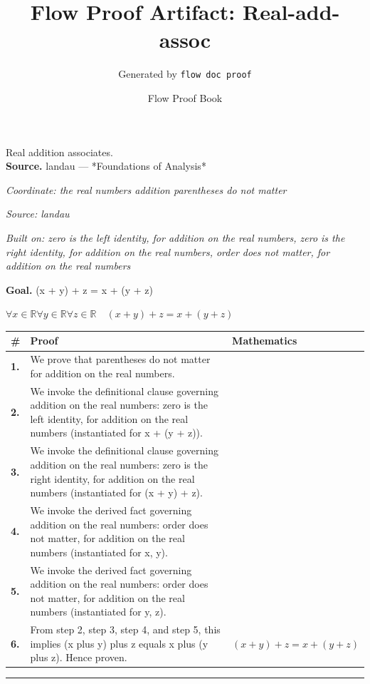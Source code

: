 \documentclass[11pt]{article}
\title{Flow Proof Artifact: Real-add-assoc}
\author{Generated by \texttt{flow doc proof}}
\date{Flow Proof Book}
\theoremstyle{definition}
\begin{document}
\maketitle
Real addition associates.\\[0.5em]
\textbf{Source.} landau — *Foundations of Analysis*\\[0.5em]
\bigskip
{}\par
\smallskip\noindent\textit{Coordinate: the real numbers \cdot addition \cdot parentheses do not matter}\par
\smallskip\noindent\textit{Source: landau}\par
\smallskip\noindent\textit{Built on: zero is the left identity, for addition on the real numbers, zero is the right identity, for addition on the real numbers, order does not matter, for addition on the real numbers}\par
\medskip
\noindent\textbf{Goal.} (x + y) + z = x + (y + z)\par
\noindent$\displaystyle \forall x \in \mathbb{R} \forall y \in \mathbb{R} \forall z \in \mathbb{R}\quad (x + y) + z = x + (y + z)$\par
\medskip
\noindent
\begin{tabular}{@{} >{\raggedright\arraybackslash}p{} >{\raggedright\arraybackslash}p{} >{\raggedleft\arraybackslash}p{} @{}}
\textbf{\#} & \textbf{Proof} & \textbf{Mathematics} \\
\midrule
\textbf{1.} & We prove that parentheses do not matter for addition on the real numbers. & \\[0.45em]
\textbf{2.} & We invoke the definitional clause governing addition on the real numbers: zero is the left identity, for addition on the real numbers (instantiated for x + (y + z)). & \\[0.45em]
\textbf{3.} & We invoke the definitional clause governing addition on the real numbers: zero is the right identity, for addition on the real numbers (instantiated for (x + y) + z). & \\[0.45em]
\textbf{4.} & We invoke the derived fact governing addition on the real numbers: order does not matter, for addition on the real numbers (instantiated for x, y). & \\[0.45em]
\textbf{5.} & We invoke the derived fact governing addition on the real numbers: order does not matter, for addition on the real numbers (instantiated for y, z). & \\[0.45em]
\textbf{6.} & From step 2, step 3, step 4, and step 5, this implies (x plus y) plus z equals x plus (y plus z). Hence proven. & $\displaystyle (x + y) + z = x + (y + z)$ \\[0.45em]
\bottomrule
\end{tabular}
\label{thm:Real-addition-parentheses_do_not_matter}
\par\medskip\hrule
\end{document}
